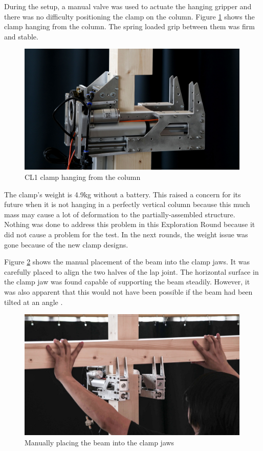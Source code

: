 During the setup, a manual valve was used to actuate the hanging gripper and there was no difficulty positioning the clamp on the column. Figure \ref{fig:cl1-clamp-hanging-photo} shows the clamp hanging from the column. The spring loaded grip between them was firm and stable.

\begin{figure}[h]
    \centering
    \includegraphics[width=0.99\textwidth]{images/04-4+5/cl1-test-closeup.jpg}
    \caption{CL1 clamp hanging from the column}
    \label{fig:cl1-clamp-hanging-photo}
\end{figure}

The clamp’s weight is 4.9kg without a battery. This raised a concern for its future when it is not hanging in a perfectly vertical column because this much mass may cause a lot of deformation to the partially-assembled structure. Nothing was done to address this problem in this Exploration Round because it did not cause a problem for the test. In the next rounds, the weight issue was gone because of the new clamp designs.

Figure \ref{fig:manual-place-beam} shows the manual placement of the beam into the clamp jaws. It was carefully placed to align the two halves of the lap joint. The horizontal surface in the clamp jaw was found capable of supporting the beam steadily. However, it was also apparent that this would not have been possible if the beam had been tilted at an angle .

\begin{figure}
    \centering
    \includegraphics[width=0.99\textwidth]{images/04-4+5/experiment-manual-place-beam.jpg}
    \caption{Manually placing the beam into the clamp jaws}
    \label{fig:manual-place-beam}
\end{figure}

